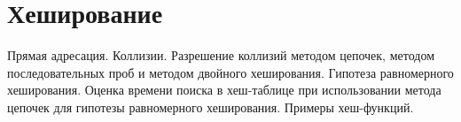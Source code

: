 \section{Хеширование}
Прямая адресация.
Коллизии.
Разрешение коллизий методом цепочек,
методом последовательных проб и методом двойного хеширования.
Гипотеза равномерного хеширования.
Оценка времени поиска в хеш-таблице при
использовании метода цепочек для гипотезы
равномерного хеширования.
Примеры хеш-функций.
